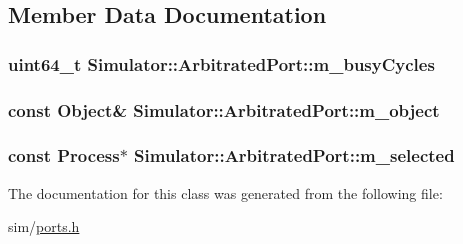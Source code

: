 \subsection{Member Data Documentation}
\hypertarget{class_simulator_1_1_arbitrated_port_a3fcbb4be3ab62853713ae33f5b3ca8b3}{
\subsubsection[{m\+\_\+busy\+Cycles}]{\setlength{\rightskip}{0pt plus 5cm}uint64\+\_\+t Simulator\+::\+Arbitrated\+Port\+::m\+\_\+busy\+Cycles\hspace{0.3cm}{\ttfamily [protected]}}}\label{class_simulator_1_1_arbitrated_port_a3fcbb4be3ab62853713ae33f5b3ca8b3}
\hypertarget{class_simulator_1_1_arbitrated_port_a1ad6a8b7489f7adbdf487d5e00c86c4d}{
\subsubsection[{m\+\_\+object}]{\setlength{\rightskip}{0pt plus 5cm}const {\bf Object}\& Simulator\+::\+Arbitrated\+Port\+::m\+\_\+object\hspace{0.3cm}{\ttfamily [protected]}}}\label{class_simulator_1_1_arbitrated_port_a1ad6a8b7489f7adbdf487d5e00c86c4d}
\hypertarget{class_simulator_1_1_arbitrated_port_a4530ac48737b148a87a44a6641d2979b}{
\subsubsection[{m\+\_\+selected}]{\setlength{\rightskip}{0pt plus 5cm}const {\bf Process}$\ast$ Simulator\+::\+Arbitrated\+Port\+::m\+\_\+selected\hspace{0.3cm}{\ttfamily [protected]}}}\label{class_simulator_1_1_arbitrated_port_a4530ac48737b148a87a44a6641d2979b}


The documentation for this class was generated from the following file\+:\begin{DoxyCompactItemize}
\item 
sim/\hyperlink{ports_8h}{ports.\+h}\end{DoxyCompactItemize}
